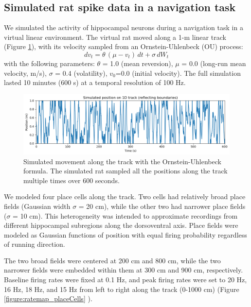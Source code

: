 \subsection{Simulated rat spike data in a navigation task}

We simulated the activity of hippocampal neurons during a navigation task in a virtual linear environment. The virtual rat moved along a 1-m linear track (Figure \ref{figure:sim_movement}), with its velocity sampled from an Ornstein-Uhlenbeck (OU) process:
$$
dv_t = \theta \, (\mu - v_t) \, dt + \sigma \, dW_t
$$
with the following parameters: $\theta$ = 1.0 (mean reversion), $\mu$ = 0.0 (long-run mean velocity, m/s), $\sigma$ = 0.4 (volatility), $v_0$=0.0 (initial velocity). The full simulation lasted 10 minutes (600 s) at a temporal resolution of 100 Hz.

\begin{figure}
    \centering
    \includegraphics[width=0.9\linewidth]{figures/simulated_movement.png}
    \caption{Simulated movement along the track with the Ornstein-Uhlenbeck formula. The simulated rat sampled all the positions along the track multiple times over 600 seconds. }
    \label{figure:sim_movement}
\end{figure}

We modeled four place cells along the track. Two cells had relatively broad place fields (Gaussian width $\sigma$ = 20 cm), while the other two had narrower place fields ($\sigma$ = 10 cm). This heterogeneity was intended to approximate recordings from different hippocampal subregions along the dorsoventral axis. Place fields were modeled as Gaussian functions of position with equal firing probability regardless of running direction.

The two broad fields were centered at 200 cm and 800 cm, while the two narrower fields were embedded within them at 300 cm and 900 cm, respectively. Baseline firing rates were fixed at 0.1 Hz, and peak firing rates were set to 20 Hz, 16 Hz, 18 Hz, and 15 Hz from left to right along the track (0-1000 cm) (Figure \ref{figure:ratemap_placeCells} ). 

